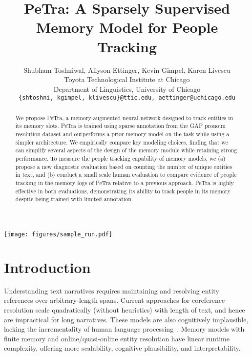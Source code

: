 \documentclass[11pt,a4paper]{article}
\title{PeTra: A Sparsely Supervised Memory Model for People Tracking}
\author{Shubham Toshniwal\Mark{1},
Allyson Ettinger\Mark{2},
Kevin Gimpel\Mark{1},
Karen Livescu\Mark{1}\\
\Mark{1}Toyota Technological Institute at Chicago\\
\Mark{2}Department of Linguistics, University of Chicago\\[0.5em]
\small{\texttt{\{shtoshni, kgimpel, klivescu\}@ttic.edu, aettinger@uchicago.edu}}\\
}
\date{}
\newcommand{\modelname}{PeTra\xspace}
\begin{document}
\maketitle

\begin{abstract}
We propose \modelname, a memory-augmented neural network designed to track entities in its memory slots. \modelname is trained using sparse annotation from the GAP pronoun resolution dataset and outperforms a prior memory model on the task while using a simpler architecture.
We empirically compare key modeling choices, finding that we can simplify several aspects of the design of the memory module
while retaining strong performance.
To measure the people tracking capability of memory models, we (a) propose
a new diagnostic evaluation based on counting the number of unique entities in text,
and (b) conduct a small scale human evaluation to compare evidence of people tracking in the memory logs of \modelname relative to a previous approach. \modelname is highly effective in both evaluations, demonstrating its ability to track people in its memory despite being trained with  limited annotation.
\end{abstract}

\begin{figure*}[ht]
    \centering
     \texttt{[image: figures/sample\_run.pdf]}
     \label{fig:ideal_run}
\end{figure*}

\section{Introduction}
Understanding text narratives requires maintaining and resolving entity references over arbitrary-length spans.
Current approaches for coreference resolution  \cite{clark-manning-2016-improving,lee-etal-2017-end, lee-etal-2018-higher, wu2019coreference} scale quadratically (without heuristics) with length of text, and hence are impractical for long narratives.
These models are also cognitively implausible, lacking the incrementality of human language processing~\cite{Tanenhaus1632, keller-2010-cognitively}.
Memory models with finite memory and online/quasi-online entity resolution have linear runtime complexity, offering more scalability, cognitive plausibility, and interpretability.
\end{document}
